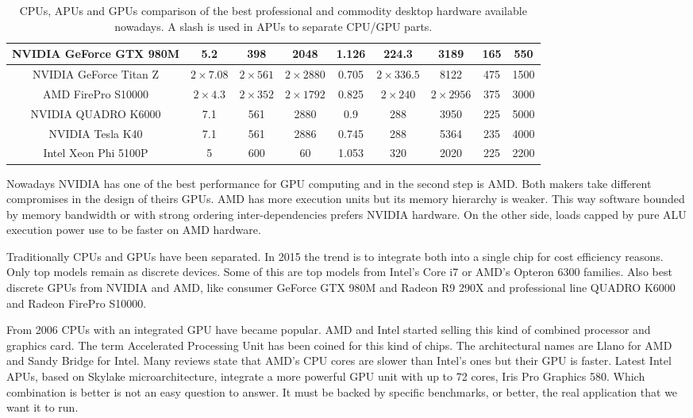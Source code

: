 \documentclass[Afour,sageh,times]{sagej}
\begin{document}
\begin{table*}[!h]
{\begin{tabular}{|c|c|c|c|c|c|c|c|c|}
\hline
NVIDIA GeForce GTX 980M & 5.2           & 398          & 2048          & 1.126      & 224.3        & 3189           & 165 & 550    \\
\hline
NVIDIA GeForce Titan Z  & $2\times7.08$ & $2\times561$ & $2\times2880$ & 0.705      & $2\times336.5$ & 8122         & 475 & 1500   \\
\hline
\hline
AMD FirePro S10000      & $2\times4.3$  & $2\times352$ & $2\times1792$ & 0.825      & $2\times240$ & $2\times2956$  & 375 & 3000   \\
\hline
NVIDIA QUADRO K6000     & 7.1           & 561          & 2880          & 0.9        & 288          & 3950           & 225 & 5000   \\
\hline
\hline
NVIDIA Tesla K40        & 7.1           & 561          & 2886          & 0.745      & 288          & 5364           & 235 & 4000   \\
\hline
Intel Xeon Phi 5100P    & 5             & 600          & 60            & 1.053      & 320          & 2020           & 225 & 2200   \\
\hline

\end{tabular}
}
\caption{CPUs, APUs and GPUs comparison of the best professional and commodity desktop hardware available nowadays. A slash is used in APUs to separate CPU/GPU parts. \label{tab:features}}
\end{table*}

Nowadays NVIDIA has one of the best performance for GPU computing \citep{benchmarkGPU2015} and in the second step is AMD. Both makers take different compromises in the design of theirs GPUs. AMD has more execution units but its memory hierarchy is weaker. This way software bounded by memory bandwidth or with strong ordering inter-dependencies prefers NVIDIA hardware. On the other side, loads capped by pure ALU execution power use to be faster on AMD hardware.

Traditionally CPUs and GPUs have been separated. In 2015 the trend is
to integrate both into a single chip for cost efficiency reasons. Only
top models remain as discrete devices. Some of this are top models
from Intel's Core i7 or AMD's Opteron 6300 families. Also best
discrete GPUs from NVIDIA and AMD, like consumer GeForce GTX 980M and
Radeon R9 290X and professional line QUADRO K6000 and Radeon FirePro
S10000.

From 2006 CPUs with an integrated GPU have became popular. AMD and Intel started selling this kind of combined processor and graphics card. The term Accelerated Processing Unit has been coined for this kind of chips. The architectural names are Llano for AMD and Sandy Bridge for Intel. Many reviews state that AMD's CPU cores are slower than Intel's ones but their GPU is faster. Latest Intel APUs, based on Skylake microarchitecture, integrate a more powerful GPU unit with up to 72 cores, Iris Pro Graphics 580. Which combination is better is not an easy question to answer. It must be backed by specific benchmarks, or better, the real application that we want it to run.
\end{document}
